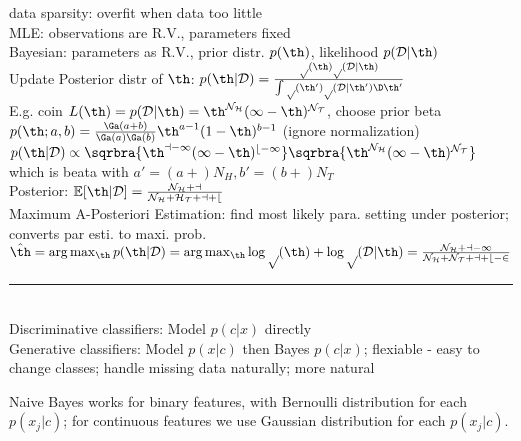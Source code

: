 \documentclass[10pt]{CheatSheet/hw}
\begin{document}
\begin{multicols*}{5}
data sparsity: overfit when data too little\\
MLE: observations are R.V., parameters fixed\\
Bayesian: parameters as R.V., prior distr. $p(\th)$, likelihood $p(\cal{D}|\th)$\\
Update Posterior distr of $\th$: $p(\th|\cal{D})=\frac{p(\th) p(\cal{D}|\th)}{\int p(\th')p(\cal{D}|\th')\D \th'}$\\
E.g. coin $L(\th)=p(\cal{D}|\th)=\th^{N_H}(1-\th)^{N_T}$, choose prior beta $p(\th; a,b)=\frac{\Ga(a+b)}{\Ga(a)\Ga(b)}\th^{a-1}(1-\th)^{b-1}$ (ignore normalization)\\
$p(\th|\cal{D})\propto \sqrbra{\th^{a-1}(1-\th)^{b-1}}\sqrbra{\th^{N_H}(1-\th)^{N_T}}$\\
which is beata with $a'=(a+)N_H, b'=(b+)N_T$\\
Posterior: $\mathbb{E}[\th|\cal{D}]=\frac{N_H+a}{N_H+H_T+a+b}$\\
Maximum A-Posteriori Estimation: find most likely para. setting under posterior; converts par esti. to maxi. prob.\\
$\hat{\th}=\arg \max_\th p(\th | \cal{D})=\arg \max_\th \log p(\th) + \log p(\cal{D}|\th)=\frac{N_H+a-1}{N_H+N_T+a+b-2}$\\
\rule{\linewidth}{0.4pt}
\\
Discriminative classifiers: Model $p(c|x)$ directly\\
Generative classifiers: Model $p(x|c)$ then Bayes $p(c|x)$; flexiable - easy to change classes; handle missing data naturally; more natural

Naive Bayes works for binary features, with Bernoulli distribution for each $p(x_j|c)$; for continuous features we use Gaussian distribution for each $p(x_j|c)$.


\end{multicols*}
\end{document}
